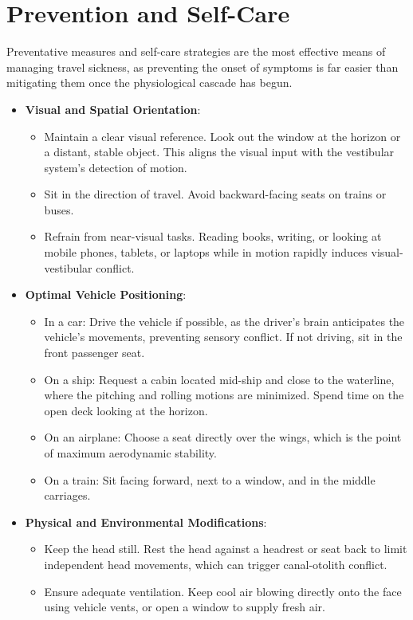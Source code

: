 \section*{Prevention and Self-Care}
Preventative measures and self-care strategies are the most effective means of managing travel sickness, as preventing the onset of symptoms is far easier than mitigating them once the physiological cascade has begun.
\begin{itemize}
    \item \textbf{Visual and Spatial Orientation}:
    \begin{itemize}
        \item Maintain a clear visual reference. Look out the window at the horizon or a distant, stable object. This aligns the visual input with the vestibular system's detection of motion.
        \item Sit in the direction of travel. Avoid backward-facing seats on trains or buses.
        \item Refrain from near-visual tasks. Reading books, writing, or looking at mobile phones, tablets, or laptops while in motion rapidly induces visual-vestibular conflict.
    \end{itemize}
    \item \textbf{Optimal Vehicle Positioning}:
    \begin{itemize}
        \item In a car: Drive the vehicle if possible, as the driver's brain anticipates the vehicle's movements, preventing sensory conflict. If not driving, sit in the front passenger seat.
        \item On a ship: Request a cabin located mid-ship and close to the waterline, where the pitching and rolling motions are minimized. Spend time on the open deck looking at the horizon.
        \item On an airplane: Choose a seat directly over the wings, which is the point of maximum aerodynamic stability.
        \item On a train: Sit facing forward, next to a window, and in the middle carriages.
    \end{itemize}
    \item \textbf{Physical and Environmental Modifications}:
    \begin{itemize}
        \item Keep the head still. Rest the head against a headrest or seat back to limit independent head movements, which can trigger canal-otolith conflict.
        \item Ensure adequate ventilation. Keep cool air blowing directly onto the face using vehicle vents, or open a window to supply fresh air.

\end{itemize}
\end{itemize}
